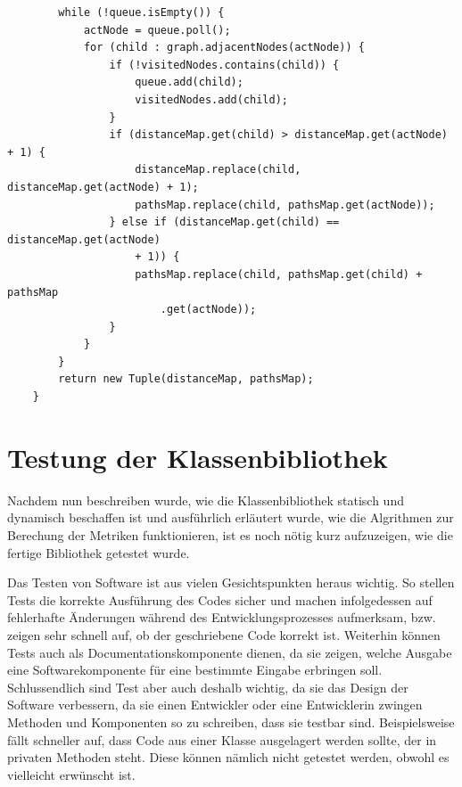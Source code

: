 \documentclass[a4paper,12pt,ngerman,chapterprefix=false,listof=totoc,bibliography=totoc]{scrreprt}
\begin{document}
{{{\begin{lstlisting}
		while (!queue.isEmpty()) {
			actNode = queue.poll();
			for (child : graph.adjacentNodes(actNode)) {
				if (!visitedNodes.contains(child)) {
					queue.add(child);
					visitedNodes.add(child);
				}
				if (distanceMap.get(child) > distanceMap.get(actNode) + 1) {
					distanceMap.replace(child, distanceMap.get(actNode) + 1);
					pathsMap.replace(child, pathsMap.get(actNode));
				} else if (distanceMap.get(child) == distanceMap.get(actNode) 
					+ 1)) {
					pathsMap.replace(child, pathsMap.get(child) + pathsMap
						.get(actNode));
				}
			}
		}
		return new Tuple(distanceMap, pathsMap);
	}
\end{lstlisting}
}
\section{Testung der Klassenbibliothek}
{
Nachdem nun beschreiben wurde, wie die Klassenbibliothek statisch und dynamisch beschaffen ist und ausführlich erläutert wurde, wie die Algrithmen zur Berechung der Metriken funktionieren, ist es noch nötig kurz aufzuzeigen, wie die fertige Bibliothek getestet wurde.

Das Testen von Software ist aus vielen Gesichtspunkten heraus wichtig. So stellen Tests die korrekte Ausführung des Codes sicher und machen infolgedessen auf fehlerhafte Änderungen während des Entwicklungsprozesses aufmerksam, bzw. zeigen sehr schnell auf, ob der geschriebene Code korrekt ist. Weiterhin können Tests auch als Documentationskomponente dienen, da sie zeigen, welche Ausgabe eine Softwarekomponente für eine bestimmte Eingabe erbringen soll. Schlussendlich sind Test aber auch deshalb wichtig, da sie das Design der Software verbessern, da sie einen Entwickler oder eine Entwicklerin zwingen Methoden und Komponenten so zu schreiben, dass sie testbar sind. Beispielsweise fällt schneller auf, dass Code aus einer Klasse ausgelagert werden sollte, der in privaten Methoden steht. Diese können nämlich nicht getestet werden, obwohl es vielleicht erwünscht ist. \cite{gulati_java_2017}

}}}
\end{document}
